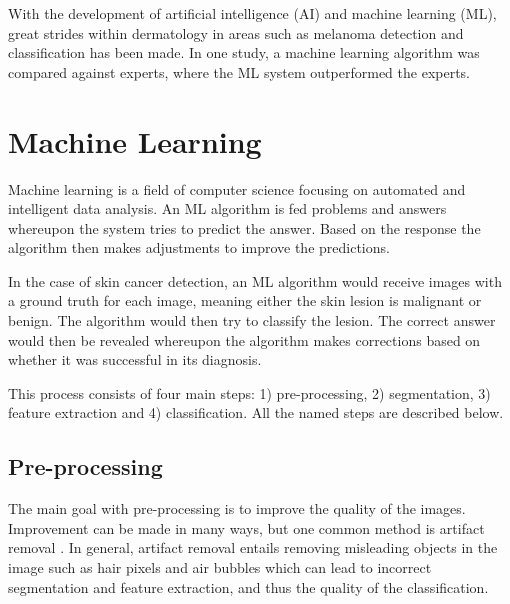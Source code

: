 \documentclass{kththesis}
\begin{document}
With the development of artificial intelligence (AI) and machine learning (ML), great strides within dermatology in areas such as melanoma detection and classification has been made. In one study, a machine learning algorithm was compared against experts, where the ML system outperformed the experts. \parencite{8030303}


\section{Machine Learning}


Machine learning is a field of computer science focusing on automated and intelligent data analysis. An ML algorithm is fed problems and answers whereupon the system tries to predict the answer. Based on the response the algorithm then makes adjustments to improve the predictions. \parencite{das2021machine}

In the case of skin cancer detection, an ML algorithm would receive images with a ground truth for each image, meaning either the skin lesion is malignant or benign. The algorithm would then try to classify the lesion. The correct answer would then be revealed whereupon the algorithm makes corrections based on whether it was successful in its diagnosis.

This process consists of four main steps: 1) pre-processing, 2) segmentation, 3) feature extraction and 4) classification. All the named steps are described below.

\subsection{Pre-processing}

The main goal with pre-processing is to improve the quality of the images. Improvement can be made in many ways, but one common method is artifact removal \parencite{8377976}.
In general, artifact removal entails removing misleading objects in the image such as hair pixels and air bubbles which can lead to incorrect segmentation and feature extraction, and thus the quality of the classification. \parencite{jaworek2016automatic}
\end{document}
